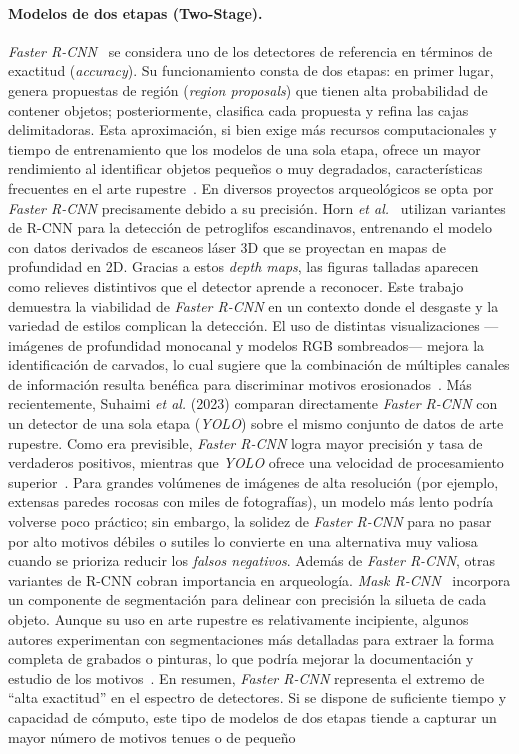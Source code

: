 \paragraph{Modelos de dos etapas (Two-Stage).}
\textit{Faster R-CNN}~\cite{ren2015faster} se considera uno de los detectores de referencia en términos de exactitud (\textit{accuracy}). Su funcionamiento consta de dos etapas: en primer lugar, genera propuestas de región (\textit{region proposals}) que tienen alta probabilidad de contener objetos; posteriormente, clasifica cada propuesta y refina las cajas delimitadoras. Esta aproximación, si bien exige más recursos computacionales y tiempo de entrenamiento que los modelos de una sola etapa, ofrece un mayor rendimiento al identificar objetos pequeños o muy degradados, características frecuentes en el arte rupestre~\cite{suhaimi2023,horn2022ai}. En diversos proyectos arqueológicos se opta por \textit{Faster R-CNN} precisamente debido a su precisión. Horn \textit{et al.}~\cite{horn2022} utilizan variantes de R-CNN para la detección de petroglifos escandinavos, entrenando el modelo con datos derivados de escaneos láser 3D que se proyectan en mapas de profundidad en 2D. Gracias a estos \emph{depth maps}, las figuras talladas aparecen como relieves distintivos que el detector aprende a reconocer. Este trabajo demuestra la viabilidad de \textit{Faster R-CNN} en un contexto donde el desgaste y la variedad de estilos complican la detección. El uso de distintas visualizaciones —imágenes de profundidad monocanal y modelos RGB sombreados— mejora la identificación de carvados, lo cual sugiere que la combinación de múltiples canales de información resulta benéfica para discriminar motivos erosionados~\cite{horn2022ai,horn2022}. Más recientemente, Suhaimi \textit{et al.} (2023) comparan directamente \textit{Faster R-CNN} con un detector de una sola etapa (\textit{YOLO}) sobre el mismo conjunto de datos de arte rupestre. Como era previsible, \textit{Faster R-CNN} logra mayor precisión y tasa de verdaderos positivos, mientras que \textit{YOLO} ofrece una velocidad de procesamiento superior~\cite{suhaimi2023}. Para grandes volúmenes de imágenes de alta resolución (por ejemplo, extensas paredes rocosas con miles de fotografías), un modelo más lento podría volverse poco práctico; sin embargo, la solidez de \textit{Faster R-CNN} para no pasar por alto motivos débiles o sutiles lo convierte en una alternativa muy valiosa cuando se prioriza reducir los \textit{falsos negativos}. Además de \textit{Faster R-CNN}, otras variantes de R-CNN cobran importancia en arqueología. \textit{Mask R-CNN}~\cite{he2017mask} incorpora un componente de segmentación para delinear con precisión la silueta de cada objeto. Aunque su uso en arte rupestre es relativamente incipiente, algunos autores experimentan con segmentaciones más detalladas para extraer la forma completa de grabados o pinturas, lo que podría mejorar la documentación y estudio de los motivos~\cite{horn2022,suhaimi2023}. En resumen, \textit{Faster R-CNN} representa el extremo de “alta exactitud” en el espectro de detectores. Si se dispone de suficiente tiempo y capacidad de cómputo, este tipo de modelos de dos etapas tiende a capturar un mayor número de motivos tenues o de pequeño 